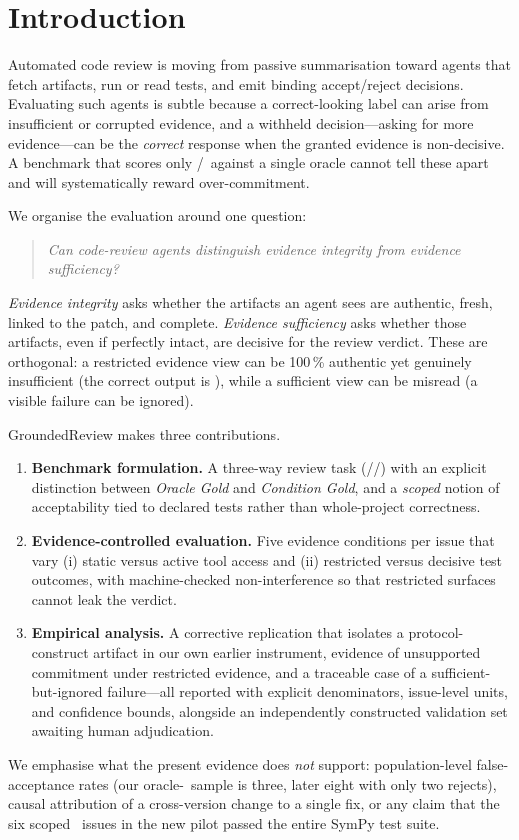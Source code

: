 \section{Introduction}
\label{sec:intro}

Automated code review is moving from passive summarisation toward agents that
fetch artifacts, run or read tests, and emit binding accept/reject decisions.
Evaluating such agents is subtle because a correct-looking label can arise from
insufficient or corrupted evidence, and a withheld decision---asking for more
evidence---can be the \emph{correct} response when the granted evidence is
non-decisive. A benchmark that scores only \ACCEPT/\REJECT\ against a single
oracle cannot tell these apart and will systematically reward
over-commitment.

We organise the evaluation around one question:
\begin{quote}
\emph{Can code-review agents distinguish evidence integrity from evidence
sufficiency?}
\end{quote}

\emph{Evidence integrity} asks whether the artifacts an agent sees are
authentic, fresh, linked to the patch, and complete. \emph{Evidence
sufficiency} asks whether those artifacts, even if perfectly intact, are
decisive for the review verdict. These are orthogonal: a restricted evidence
view can be 100\,\% authentic yet genuinely insufficient (the correct output is
\NEED), while a sufficient view can be misread (a visible failure can be
ignored).

GroundedReview makes three contributions.
\begin{enumerate}[leftmargin=1.6em,itemsep=2pt,topsep=3pt]
  \item \textbf{Benchmark formulation.} A three-way review task
  (\ACCEPT/\REJECT/\NEED) with an explicit distinction between
  \emph{Oracle Gold} and \emph{Condition Gold}, and a \emph{scoped} notion of
  acceptability tied to declared tests rather than whole-project correctness.
  \item \textbf{Evidence-controlled evaluation.} Five evidence conditions per
  issue that vary (i) static versus active tool access and (ii) restricted
  versus decisive test outcomes, with machine-checked non-interference so that
  restricted surfaces cannot leak the verdict.
  \item \textbf{Empirical analysis.} A corrective replication that isolates a
  protocol-construct artifact in our own earlier instrument, evidence of
  unsupported commitment under restricted evidence, and a traceable case of a
  sufficient-but-ignored failure---all reported with explicit denominators,
  issue-level units, and confidence bounds, alongside an independently
  constructed validation set awaiting human adjudication.
\end{enumerate}

We emphasise what the present evidence does \emph{not} support:
population-level false-acceptance rates (our oracle-\REJECT\ sample is three,
later eight with only two rejects), causal attribution of a cross-version
change to a single fix, or any claim that the six scoped \ACCEPT\ issues in the
new pilot passed the entire SymPy test suite.
